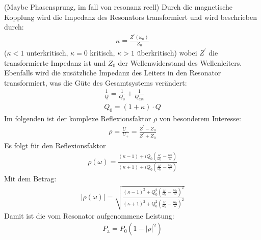 \documentclass[11pt, a4paper]{scrbook}
\begin{document}
	
	
	
	
	
	(Maybe Phasensprung, im fall von resonanz reell)
	Durch die magnetische Kopplung wird die Impedanz des Resonators transformiert und wird beschrieben durch:
	\begin{align}
		\kappa = \frac{Z^\prime(\omega_0)}{Z_0}
	\end{align}
	($\kappa < 1$ unterkritisch, $\kappa = 0$ kritisch, $\kappa > 1$ überkritisch)
	wobei $Z^\prime$ die transformierte Impedanz ist und $Z_0$ der Wellenwiderstand des Wellenleiters.
	Ebenfalls wird die zusätzliche Impedanz des Leiters in den Resonator transformiert, was die Güte des Gesamtsystems verändert:
	\begin{align}
		\frac{1}{Q} = \frac{1}{Q_0} + \frac{1}{Q_\mathrm{ext}} \\
		Q_0 = (1 + \kappa) \cdot Q
	\end{align}
	Im folgenden ist der komplexe Reflexionsfaktor $\rho$ von besonderem Interesse:
	\begin{align}
		\rho = \frac{U_{-}}{U_{+}} = \frac{Z^\prime - Z_0}{Z^\prime + Z_0}
	\end{align}
	Es folgt für den Reflexionsfaktor
	\begin{align}
		\rho(\omega) = \frac{(\kappa - 1) + i  Q_0 \left( \frac{\omega}{\omega_0}  - \frac{\omega_0}{\omega}\right)}{\left( \kappa + 1 \right) + i  Q_0 \left( \frac{\omega}{\omega_0}  - \frac{\omega_0}{\omega}\right)}
	\end{align}
	Mit dem Betrag:
	\begin{align}
		| \rho(\omega) | = \sqrt{\frac{(\kappa - 1)^2 + Q_0^2 \left( \frac{\omega}{\omega_0}  - \frac{\omega_0}{\omega}\right)^2}{(\kappa + 1)^2 + Q_0^2 \left( \frac{\omega}{\omega_0}  - \frac{\omega_0}{\omega}\right)^2}}
	\end{align}
	Damit ist die vom Resonator aufgenommene Leistung:
	\begin{align}
		P_\mathrm{a} = P_0 (1- |\rho|^2)
	\end{align}
\end{document}
